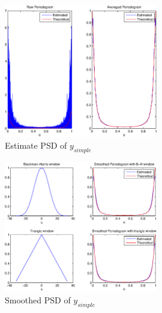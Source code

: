 \documentclass[10pt]{article}
\begin{document}
\begin{figure}[!hp]

    \begin{center}
      \includegraphics[width=0.6\textwidth]{Periodogram}
    \caption{Estimate PSD of $y_{simple}$ \label{fig:PSDest}}
    \end{center}

\end{figure}

\begin{figure}[!hp]

    \begin{center}
      \includegraphics[width=0.6\textwidth]{Smoothed}
    \caption{Smoothed PSD of $y_{simple}$ \label{fig:PSDSmooth}}
    \end{center}

\end{figure}
\end{document}

